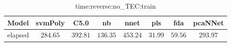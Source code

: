 \begin{table}[!ht]
	\centering
	\begin{tabular}{|c|c|c|c|c|c|c|c|}
		\hline
		Model & svmPoly & C5.0 & nb & nnet & pls & fda & pcaNNet \\ \hline
		elapsed & $284.65$ & $392.81$ & $136.35$ & $453.24$ & $31.99$ & $59.56$ & $293.97$ \\ \hline
	\end{tabular}
	\caption{time:reverse:no_TEC:train}
	\label{tab:time:reverse:no_TEC:train}
\end{table}
